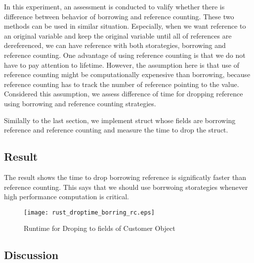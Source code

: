 In this experiment, an assessment is conducted to valify whether there is difference between behavior of borrowing and reference counting. 
These two methods can be used in similar situation. Especially, when we want reference to an original variable and keep the original variable until all of references are dereferenced, 
we can have reference with both storategies, borrowing and reference counting. One advantage of using reference counting is that we do not have to pay attention to lifetime.
However, the assumption here is that use of reference counting might be computationally expenesive than borrowing, because reference counting has to track the number of reference pointing to the value. 
Considered this assumption, we assess difference of time for dropping reference using borrowing and reference counting strategies. 

Similally to the last section, we implement struct whose fields are borrowing reference and reference counting and measure the time to drop the struct. 


\subsection{Result}
The result shows the time to drop borrowing reference is significatly faster than reference counting. This says that we should use borrwoing storategies whenever high performance computation is critical.
\begin{figure}[htb!]
    \texttt{[image: rust\_droptime\_borring\_rc.eps]}
    \caption{Runtime for Droping to fields of Customer Object}
    \label{fig:Sampling}
\end{figure}



\subsection{Discussion}
